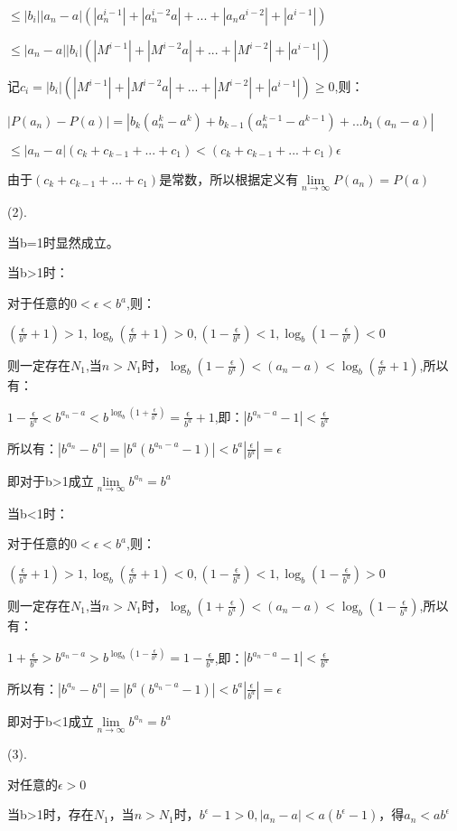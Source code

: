 \documentclass[12pt]{ctexart}
\begin{document}
$\le|b_i||a_n-a|(|a_n^{i-1}|+|a_n^{i-2}a|+...+|a_na^{i-2}|+|a^{i-1}|)$

$\le|a_n-a||b_i|(|M^{i-1}|+|M^{i-2}a|+...+|M^{i-2}|+|a^{i-1}|)$

记$c_i=|b_i|(|M^{i-1}|+|M^{i-2}a|+...+|M^{i-2}|+|a^{i-1}|)\ge0$,则：

$|P(a_n)-P(a)|=|b_k(a_n^k-a^k)+b_{k-1}(a_n^{k-1}-a^{k-1})+...b_1(a_n-a)|$

$\le|a_n-a|(c_k+c_{k-1}+...+c_1)<(c_k+c_{k-1}+...+c_1)\epsilon$

由于$(c_k+c_{k-1}+...+c_1)$是常数，所以根据定义有$\lim\limits_{n\to\infty}P(a_n)=P(a)$

(2).

当b=1时显然成立。

当b>1时：

对于任意的$0<\epsilon<b^a$,则：

$(\frac{\epsilon}{b^a}+1)>1,\log_b{(\frac{\epsilon}{b^a}+1)}>0, (1-\frac{\epsilon}{b^a})<1,\log_b{(1-\frac{\epsilon}{b^a})}<0$

则一定存在$N_1$,当$n>N_1$时，$\log_b{(1-\frac{\epsilon}{b^a})}<(a_n-a)<\log_b{(\frac{\epsilon}{b^a}+1)}$,所以有：

$1-\frac{\epsilon}{b^a}<b^{a_n-a}<b^{\log_b{(1+\frac{\epsilon}{b^a})}}=\frac{\epsilon}{b^a}+1$,即：$|b^{a_n-a}-1|<\frac{\epsilon}{b^a}$

所以有：$|b^{a_n}-b^a|=|b^a(b^{a_n-a}-1)|<b^a|\frac{\epsilon}{b^a}|=\epsilon$

即对于b>1成立$\lim\limits_{n\to\infty}b^{a_n}=b^a$

当b<1时：

对于任意的$0<\epsilon<b^a$,则：

$(\frac{\epsilon}{b^a}+1)>1,\log_b{(\frac{\epsilon}{b^a}+1)}<0, (1-\frac{\epsilon}{b^a})<1,\log_b{(1-\frac{\epsilon}{b^a})}>0$

则一定存在$N_1$,当$n>N_1$时，$\log_b{(1+\frac{\epsilon}{b^a})}<(a_n-a)<\log_b{(1-\frac{\epsilon}{b^a})}$,所以有：

$1+\frac{\epsilon}{b^a}>b^{a_n-a}>b^{\log_b{(1-\frac{\epsilon}{b^a})}}=1-\frac{\epsilon}{b^a}$,即：$|b^{a_n-a}-1|<\frac{\epsilon}{b^a}$

所以有：$|b^{a_n}-b^a|=|b^a(b^{a_n-a}-1)|<b^a|\frac{\epsilon}{b^a}|=\epsilon$

即对于b<1成立$\lim\limits_{n\to\infty}b^{a_n}=b^a$

(3).

对任意的$\epsilon>0$

当b>1时，存在$N_1$，当$n>N_1$时，$b^{\epsilon}-1>0,|a_n-a|<a(b^{\epsilon}-1)$，得$a_n<ab^{\epsilon}$
\end{document}

